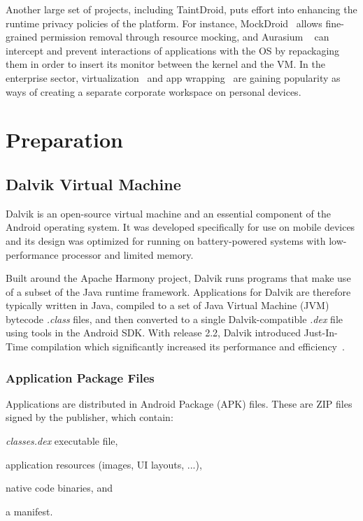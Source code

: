 \documentclass[12pt,twoside,notitlepage]{report}
\begin{document}
Another large set of projects, including TaintDroid, puts effort into enhancing the runtime privacy policies of the platform. For instance, MockDroid~\cite{Beresford:2011:MTP:2184489.2184500} allows fine-grained permission removal through resource mocking, and Aurasium ~\cite{Xu:2012:APP:2362793.2362820} can intercept and prevent interactions of applications with the OS by repackaging them in order to insert its monitor between the kernel and the VM. In the enterprise sector, virtualization~\cite{web:Virtualization} and app wrapping~\cite{web:AppWrapping} are gaining popularity as ways of creating a separate corporate workspace on personal devices.

\cleardoublepage
\chapter{Preparation}

\section{Dalvik Virtual Machine}

Dalvik is an open-source virtual machine and an essential component of the Android operating system. It was developed specifically for use on mobile devices and its design was optimized for running on battery-powered systems with low-performance processor and limited memory. 

Built around the Apache Harmony project, Dalvik runs programs that make use of a subset of the Java runtime framework. Applications for Dalvik are therefore typically written in Java, compiled to a set of Java Virtual Machine (JVM) bytecode \emph{.class} files, and then converted to a single Dalvik-compatible \emph{.dex} file~\cite{web:DalvikDex} using tools in the Android SDK. With release 2.2, Dalvik introduced Just-In-Time compilation which significantly increased its performance and efficiency~\cite{web:DalvikJit}.

\subsection{Application Package Files}

Applications are distributed in Android Package (APK) files. These are ZIP files signed by the publisher, which contain:
\begin{inparaenum}[(i)]
\item \emph{classes.dex} executable file,
\item application resources (images, UI layouts, ...),
\item native code binaries, and
\item a manifest.
\end{inparaenum}
\end{document}
